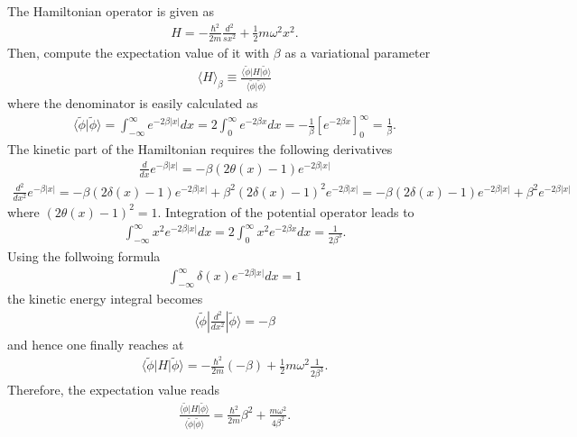 \documentclass{jlreq}
\begin{document}
The Hamiltonian operator is given as
\begin{align}
    H=-\frac{\hbar^2}{2m}\frac{d^2}{sx^2}+\frac{1}{2}m\omega^2x^2.
\end{align}
Then, compute the expectation value of it with $\beta$ as a variational parameter
\begin{align}
    \langle H\rangle_\beta\equiv\frac{\langle\tilde{\phi}|H|\tilde{\phi}\rangle}{\langle\tilde{\phi}|\tilde{\phi}\rangle}
\end{align}
where the denominator is easily calculated as
\begin{align}
    \langle\tilde{\phi}|\tilde{\phi}\rangle=\int^\infty_{-\infty}e^{-2\beta|x|} dx=2\int^\infty_{0}e^{-2\beta x} dx = -\frac{1}{\beta}[e^{-2\beta x}]^\infty_0=\frac{1}{\beta}.
\end{align}
The kinetic part of the Hamiltonian requires the following derivatives
\begin{align}
    \frac{d}{dx}e^{-\beta |x|}=-\beta (2\theta(x)-1)e^{-2\beta |x|}
\end{align}
\begin{align}
    \frac{d^2}{dx^2}e^{-\beta |x|}=-\beta (2\delta(x)-1)e^{-2\beta |x|}+\beta^2 (2\delta(x)-1)^2 e^{-2\beta |x|}=-\beta (2\delta(x)-1)e^{-2\beta |x|}+\beta^2 e^{-2\beta |x|}
\end{align}
where $(2\theta(x)-1)^2=1$. Integration of the potential operator leads to
\begin{align}
    \int^\infty_{-\infty} x^2 e^{-2\beta|x|}dx=2\int^{\infty}_0 x^2 e^{-2\beta x}dx=\frac{1}{2\beta^3}.
\end{align}
Using the follwoing formula
\begin{align}
    \int^\infty_{-\infty} \delta(x) e^{-2\beta|x|}dx=1
\end{align}
the kinetic energy integral becomes
\begin{align}
    \langle\tilde{\phi}|\frac{d^2}{dx^2}|\tilde{\phi}\rangle=-\beta
\end{align}
and hence one finally reaches at
\begin{align}
    \langle\tilde{\phi}|H|\tilde{\phi}\rangle=-\frac{\hbar^2}{2m}(-\beta)+\frac{1}{2}m\omega^2\frac{1}{2\beta^3}.
\end{align}
Therefore, the expectation value reads
\begin{align}
    \frac{\langle\tilde{\phi}|H|\tilde{\phi}\rangle}{\langle\tilde{\phi}|\tilde{\phi}\rangle}=\frac{\hbar^2}{2m}\beta^2+\frac{m\omega^2}{4\beta^2}.
\end{align}
\end{document}
